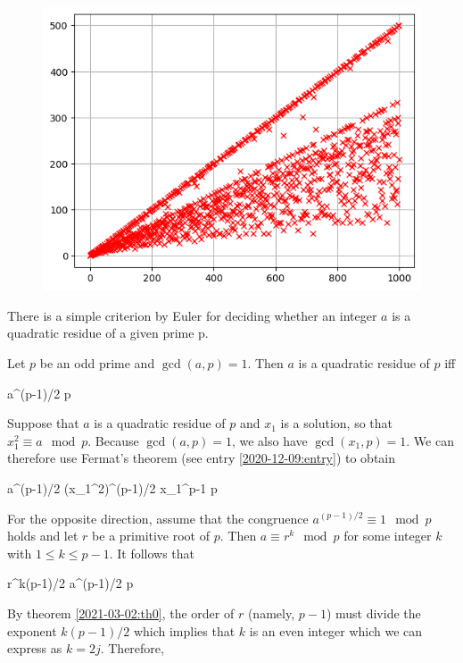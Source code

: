 \begin{figure}[H]
    \centering
    \includegraphics[scale=0.7]{images/2023-02-13-num_quad_residues.png}
\end{figure}


There is a simple criterion by Euler for deciding whether an integer $a$ is a quadratic residue of a given prime p.

\begin{theorem}
Let $p$ be an odd prime and $\gcd(a,p)=1$. Then $a$ is a quadratic residue of $p$ iff

\bee
a^{(p-1)/2}  \mod p
\eee
\end{theorem}

Suppose that $a$ is a quadratic residue of $p$ and $x_1$ is a solution, so that $x_1^2 \equiv a \mod p$. Because $\gcd(a,p) = 1$, we also have $\gcd(x_1,p) = 1$. We can therefore use Fermat's theorem (see entry \ref{2020-12-09:entry}) to obtain

\bee
a^{(p-1)/2} \equiv (x_1^2)^{(p-1)/2} \equiv x_1^{p-1}  \mod p
\eee

For the opposite direction, assume that the congruence $a^{(p-1)/2} \equiv 1 \mod p$ holds and let $r$ be a primitive root of $p$. Then $a \equiv r^k \mod p$ for some integer $k$ with $1 \leq k \leq p-1$. It follows that

\bee
r^{k(p-1)/2} \equiv a^{(p-1)/2}  \mod p
\eee

By theorem \ref{2021-03-02:th0}, the order of $r$ (namely, $p-1$) must divide the exponent $k(p-1)/2$ which implies that $k$ is an even integer which we can express as $k = 2j$. Therefore,


